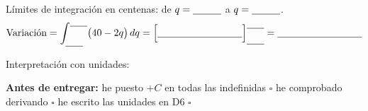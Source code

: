 \documentclass[11pt]{article}
\begin{document}
Límites de integración en centenas: de \(q=\hueco[1cm]\) a \(q=\hueco[1cm]\).
\[\text{Variación}=\int_{\hueco[0.6cm]}^{\hueco[0.6cm]}\bigl(40-2q\bigr)\,dq=\Bigl[\hueco[3cm]\Bigr]_{\hueco[0.6cm]}^{\hueco[0.6cm]}=\hueco[3cm]\]

Interpretación con unidades: \hrulefill

\vfill
\noindent\textbf{Antes de entregar:} he puesto \(+C\) en todas las indefinidas \(\square\) \quad he comprobado derivando \(\square\) \quad he escrito las unidades en D6 \(\square\)
\end{document}
